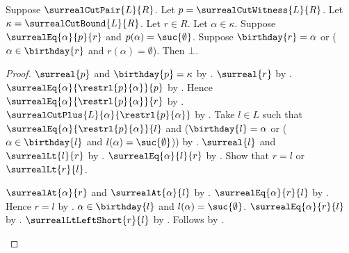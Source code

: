 \begin{lemma}\label{surreal_cut_positive_cannot_cross_right}
    Suppose $\surrealCutPair{L}{R}$.
    Let $p=\surrealCutWitness{L}{R}$.
    Let $\kappa=\surrealCutBound{L}{R}$.
    Let $r\in R$.
    Let $\alpha\in\kappa$.
    Suppose $\surrealEq{\alpha}{p}{r}$ and
        $p(\alpha)=\suc{\emptyset}$.
    Suppose $\birthday{r}=\alpha$ or
        ($\alpha\in\birthday{r}$ and $r(\alpha)=\emptyset$).
    Then $\bot$.
\end{lemma}
\begin{proof}
    $\surreal{p}$ and $\birthday{p}=\kappa$
        by .
    $\surreal{r}$ by .
    $\surrealEq{\alpha}{\restrl{p}{\alpha}}{p}$
        by .
    Hence $\surrealEq{\alpha}{\restrl{p}{\alpha}}{r}$
        by .
    $\surrealCutPlus{L}{\alpha}{\restrl{p}{\alpha}}$
        by .
    Take $l\in L$ such that
        $\surrealEq{\alpha}{\restrl{p}{\alpha}}{l}$ and
        ($\birthday{l}=\alpha$ or
         ($\alpha\in\birthday{l}$ and
          $l(\alpha)=\suc{\emptyset}$))
        by .
    $\surreal{l}$ and $\surrealLt{l}{r}$
        by .
    $\surrealEq{\alpha}{l}{r}$
        by .
    Show that $r=l$ or $\surrealLt{r}{l}$.
    \begin{subproof}
        \begin{byCase}
                \begin{byCase}
                        $\surrealAt{\alpha}{r}$ and
                            $\surrealAt{\alpha}{l}$
                            by .
                        $\surrealEq{\alpha}{r}{l}$
                            by .
                        Hence $r=l$
                            by .
                        $\alpha\in\birthday{l}$ and
                            $l(\alpha)=\suc{\emptyset}$.
                        $\surrealEq{\alpha}{r}{l}$
                            by .
                        $\surrealLtLeftShort{r}{l}$
                            by .
                        Follows by .
                \end{byCase}

\end{byCase}
\end{subproof}
\end{proof}
